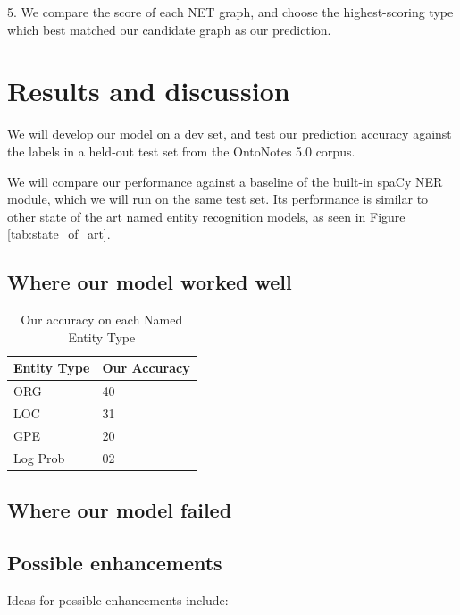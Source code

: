 \documentclass[11pt,a4paper]{article}
\begin{document}
5. We compare the score of each NET graph, and choose the highest-scoring type which best matched our candidate graph as our prediction.

\section{Results and discussion}

We will develop our model on a dev set, and test our prediction accuracy against the labels in a held-out test set from the OntoNotes 5.0 corpus.

We will compare our performance against a baseline of the built-in spaCy NER module, which we will run on the same test set. Its performance is similar to other state of the art named entity recognition models, as seen in Figure \ref{tab:state_of_art}.



\subsection{Where our model worked well}

\begin{table}[h]
\begin{tabular}{@{}ll@{}}
\toprule
Entity Type & Our Accuracy \\ \midrule
ORG         & 40           \\
LOC         & 31           \\
GPE         & 20           \\
Log Prob    & 02          
\end{tabular}
\caption{Our accuracy on each Named Entity Type}
\end{table}

\subsection{Where our model failed}

\subsection{Possible enhancements}

Ideas for possible enhancements include:
\end{document}

